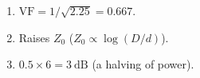 \begin{enumerate}[leftmargin=1.6em,itemsep=2pt]
\item $\text{VF} = 1/\sqrt{2.25} = 0.667$.
\item Raises $Z_0$ ($Z_0 \propto \log(D/d)$).
\item $0.5\times6 = 3\ \text{dB}$ (a halving of power).
\end{enumerate}
